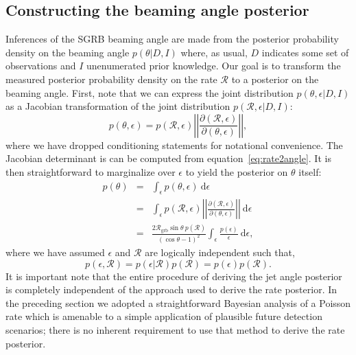 \documentclass[twocolumn,nofootinbib]{revtex4-1}
\newcommand{\grbrate}{{{\mathcal R}_{\mathrm{grb}}}}
\newcommand{\cbcrate}{{{\mathcal R}}}
\newcommand{\diff}{{\mathrm d}}
\begin{document}
\subsection{Constructing the beaming angle posterior}
Inferences of the \ac{SGRB} beaming angle are made from the posterior
probability density on the beaming angle $p(\theta|D,I)$ where, as
usual, $D$ indicates some set of observations and $I$ unenumerated
prior knowledge.  Our goal is to transform the measured posterior
probability density on the rate $\cbcrate$ to a posterior on the
beaming angle.
%
First, note that we can express the joint distribution
$p(\theta, \epsilon|D,I)$ as a Jacobian transformation of the joint
distribution $p(\cbcrate, \epsilon|D,I)$:
\begin{equation}
p(\theta,\epsilon) = p(\cbcrate,\epsilon)
\left\lvert\left\lvert
\frac{\partial(\cbcrate,\epsilon)}{\partial(\theta,\epsilon)}
\right\rvert\right\rvert,
\end{equation}
%
where we have dropped conditioning statements for notational convenience.
The Jacobian determinant is can be  computed from equation~\ref{eq:rate2angle}.
It is then straightforward to marginalize over $\epsilon$ to yield the posterior on $\theta$ itself:
%
\begin{eqnarray}
    \label{eq:beam_posterior}
    p(\theta) & = & \int_{\epsilon} p(\theta,\epsilon)~\diff \epsilon\\
              & = & \int_{\epsilon} p(\cbcrate,\epsilon)
    \left\lvert\left\lvert
    \frac{\partial(\cbcrate,\epsilon)}{\partial(\theta,\epsilon)}
    \right\rvert\right\rvert~\diff \epsilon \\
              & = & \frac{2\grbrate \sin
\theta~p(\cbcrate)}{(\cos\theta-1)^2}\int_{\epsilon}
\frac{p(\epsilon)}{\epsilon} ~\diff \epsilon,
\end{eqnarray}
%
where we have assumed $\epsilon$ and $\cbcrate$ are logically independent such that,
\begin{equation}
p(\epsilon,\cbcrate) = p(\epsilon|\cbcrate)p(\cbcrate) = p(\epsilon)p(\cbcrate).
\end{equation}
%
It is important note that the entire procedure of deriving the jet
angle posterior is completely independent of the approach used to
derive the rate posterior.  In the preceding section we adopted a
straightforward Bayesian analysis of a Poisson rate which is amenable
to a simple application of plausible future detection scenarios; there
is no inherent requirement to use that method to derive the rate
posterior.
\end{document}
